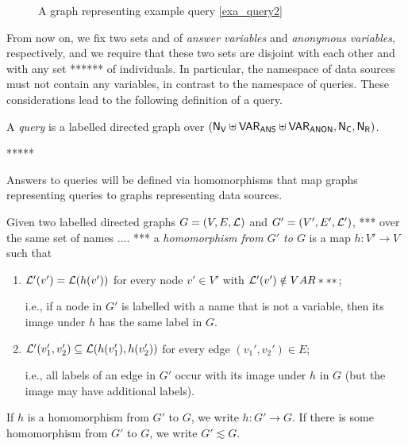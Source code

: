 \begin{figure}
  \caption{A graph representing example query \ref{exa_query2}}
  \label{fig:graph_for_exa_query2}
\end{figure}

From now on, we fix two sets \VARANS and \VARANON
of \emph{answer variables} and \emph{anonymous variables}, respectively,
and we require that these two sets are disjoint with each other
and with any set ****** of individuals.
In particular, the namespace of data sources must not contain any variables,
in contrast to the namespace of queries.
These considerations lead to the following definition of a query.

\begin{definition}
  A \emph{query} is a labelled directed graph
  over $(\mathsf{N}_\mathsf{V} \uplus \mathsf{VAR}_\mathsf{ANS} \uplus \mathsf{VAR}_\mathsf{ANON}, \mathsf{N}_\mathsf{C}, \mathsf{N}_\mathsf{R})$.
\end{definition}




*****


Answers to queries will be defined via homomorphisms that map graphs representing queries
to graphs representing data sources.
%
\begin{definition}
  Given two labelled directed graphs $G = (V,E,\mathcal{L})$ and $G' = (V',E',\mathcal{L}')$,
  *** over the same set of names .... ***
  a \emph{homomorphism from $G'$ to $G$} is a map $h : V' \to V$ such that
  \begin{enumerate}
    \item
      $\mathcal{L}'(v') = \mathcal{L}(h(v'))$ for every node $v' \in V'$ with $\mathcal{L}'(v') \notin VAR***$;
      
      i.e., if a node in $G'$ is labelled with a name that is not a variable,
      then its image under $h$ has the same label in $G$.
    \item
      $\mathcal{L}'(v_1', v_2') \subseteq \mathcal{L}(h(v_1'), h(v_2'))$
      for every edge $(v_1',v_2') \in E$;
      
      i.e., all labels of an edge in $G'$ occur with its image under $h$ in $G$
      (but the image may have additional labels).
  \end{enumerate}
  If $h$ is a homomorphism from $G'$ to $G$, we write $h : G' \to G$.
  If there is some homomorphism from $G'$ to $G$, we write $G' \lesssim G$.
\end{definition}

